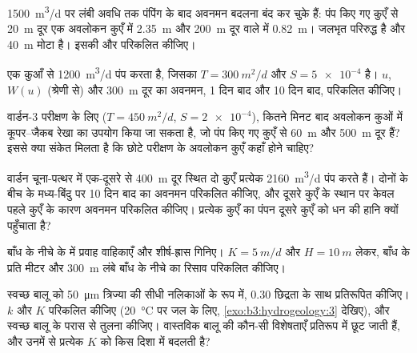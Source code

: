 \begin{exercise}[$\star\star$]\label{exo:b3:hydrogeology:5}
\qty{1500}{m^3/d} पर लंबी अवधि तक पंपिंग के बाद अवनमन
बदलना बंद कर चुके हैं: पंप किए गए कुएँ से \qty{20}{m} दूर एक अवलोकन कुएँ में \qty{2.35}{m} और
\qty{200}{m} दूर वाले में \qty{0.82}{m}। जलभृत परिरुद्ध है और
\qty{40}{m} मोटा है। इसकी  और  परिकलित कीजिए।
\end{exercise}

\begin{exercise}[$\star\star$]\label{exo:b3:hydrogeology:6}
एक कुआँ  से \qty{1200}{m^3/d} पंप करता है, जिसका $T =
\qty{300}{m^2/d}$ और $S = \num{5e-4}$ है। $u$, $W(u)$ (श्रेणी से) और
\qty{300}{m} दूर का अवनमन, 1 दिन बाद और 10 दिन बाद, परिकलित कीजिए।
\end{exercise}

\begin{exercise}[$\star\star$]\label{exo:b3:hydrogeology:7}
वार्डन-3 परीक्षण के लिए ($T = \qty{450}{m^2/d}$, $S = \num{2e-4}$), कितने मिनट
बाद अवलोकन कुओं में कूपर--जैकब रेखा का उपयोग किया जा सकता है,
जो पंप किए गए कुएँ से \qty{60}{m} और \qty{500}{m} दूर हैं? इससे क्या संकेत मिलता है
कि छोटे परीक्षण के अवलोकन कुएँ कहाँ होने चाहिए?
\end{exercise}

\begin{exercise}[$\star\star$]\label{exo:b3:hydrogeology:8}
वार्डन चूना-पत्थर में एक-दूसरे से \qty{400}{m} दूर स्थित दो कुएँ प्रत्येक
\qty{2160}{m^3/d} पंप करते हैं। दोनों के बीच के मध्य-बिंदु पर 10 दिन बाद का अवनमन परिकलित कीजिए,
और दूसरे कुएँ के स्थान पर केवल पहले कुएँ के कारण अवनमन परिकलित कीजिए। प्रत्येक कुएँ का
पंपन दूसरे कुएँ को धन की हानि क्यों पहुँचाता है?
\end{exercise}

\begin{exercise}[$\star\star$]\label{exo:b3:hydrogeology:9}
बाँध के नीचे के  में प्रवाह वाहिकाएँ और शीर्ष-ह्रास गिनिए।
$K = \qty{5}{m/d}$ और $H = \qty{10}{m}$ लेकर, बाँध के प्रति
मीटर और \qty{300}{m} लंबे बाँध के नीचे का रिसाव परिकलित कीजिए।
\end{exercise}

\begin{exercise}[$\star\star\star$]\label{exo:b3:hydrogeology:10}
स्वच्छ बालू को \qty{50}{\micro\metre} त्रिज्या की सीधी नलिकाओं के रूप में,
0.30 छिद्रता के साथ प्रतिरूपित कीजिए। $k$ और $K$ परिकलित कीजिए (\qty{20}{\celsius} पर जल के लिए,
\cref{exo:b3:hydrogeology:3} देखिए),
और स्वच्छ बालू के परास से तुलना कीजिए। वास्तविक बालू की कौन-सी विशेषताएँ
प्रतिरूप में छूट जाती हैं, और उनमें से प्रत्येक $K$ को किस दिशा में बदलती है?
\end{exercise}


